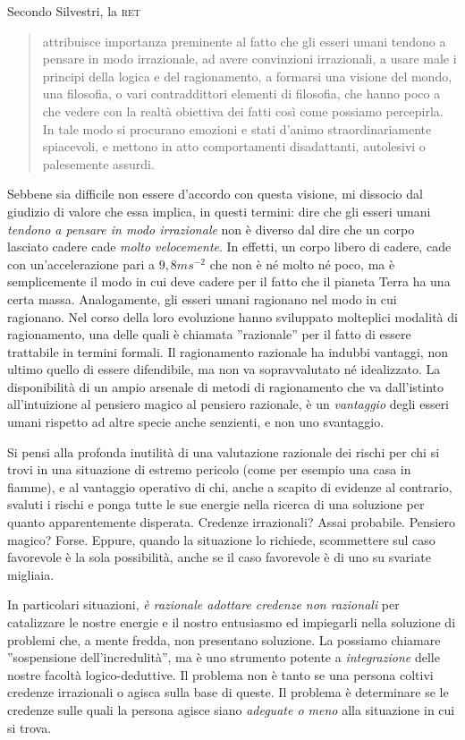 \noindent Secondo Silvestri, la \textsc{ret}
\begin{quote}
attribuisce importanza preminente al fatto che gli esseri umani tendono a pensare in modo irrazionale, ad avere convinzioni irrazionali, a usare male i principi della logica e del ragionamento, a formarsi una visione del mondo, una filosofia, o vari contraddittori elementi di filosofia, che hanno poco a che vedere con la realtà obiettiva dei fatti così come possiamo percepirla. In tale modo si procurano emozioni e stati d'animo straordinariamente spiacevoli, e mettono in atto comportamenti disadattanti, autolesivi o palesemente assurdi.
\end{quote}

\noindent Sebbene sia difficile non essere d'accordo con questa visione, mi dissocio dal giudizio di valore che essa implica, in questi termini: dire che gli esseri umani \emph{tendono a pensare in modo irrazionale} non è diverso dal dire che un corpo lasciato cadere cade \emph{molto velocemente}. In effetti, un corpo libero di cadere, cade con un'accelerazione pari a $9,8ms^{-2}$ che non è né molto né poco, ma è semplicemente il modo in cui deve cadere per il fatto che il pianeta Terra ha una certa massa. Analogamente, gli esseri umani ragionano nel modo in cui ragionano. Nel corso della loro evoluzione hanno sviluppato molteplici modalità di ragionamento, una delle quali è chiamata ''razionale'' per il fatto di essere trattabile in termini formali. Il ragionamento razionale ha indubbi vantaggi, non ultimo quello di essere difendibile, ma non va sopravvalutato né idealizzato. 
La disponibilità di un ampio arsenale di metodi di ragionamento che va dall'istinto all'intuizione al pensiero magico al pensiero razionale, è un \emph{vantaggio} degli esseri umani rispetto ad altre specie anche senzienti, e non uno svantaggio.

Si pensi alla profonda inutilità di una valutazione razionale dei rischi per chi si trovi in una situazione di estremo pericolo (come per esempio una casa in fiamme), e al vantaggio operativo di chi, anche a scapito di evidenze al contrario, svaluti i rischi e ponga tutte le sue energie nella ricerca di una soluzione per quanto apparentemente disperata. Credenze irrazionali? Assai probabile. Pensiero magico? Forse. Eppure, quando la situazione lo richiede, scommettere sul caso favorevole è la sola possibilità, anche se il caso favorevole è di uno su svariate migliaia.

In particolari situazioni, \emph{è razionale adottare credenze non razionali} per catalizzare le nostre energie e il nostro entusiasmo ed impiegarli nella soluzione di problemi che, a mente fredda, non presentano soluzione. La possiamo chiamare ''sospensione dell'incredulità'', ma è uno strumento potente a \emph{integrazione} delle nostre facoltà logico-deduttive.
Il problema non è tanto se una persona coltivi credenze irrazionali o agisca sulla base di queste. Il problema è determinare se le credenze sulle quali la persona agisce siano \emph{adeguate o meno} alla situazione in cui si trova.

